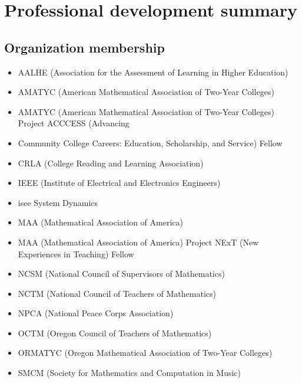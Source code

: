 \chapter{Professional development summary}\label{app:sec:memberships}

\begin{widepage}
\begin{multicols*}{2}
\section*{Organization membership}

\begin{itemize}[label={}]
\item AALHE (Association for the Assessment of Learning in Higher Education)
\item AMATYC (American Mathematical Association of Two-Year Colleges)
\item AMATYC (American Mathematical Association of Two-Year Colleges) Project ACCCESS  (Advancing \item Community College Careers:  Education, Scholarship, and Service) Fellow
\item CRLA (College Reading and Learning Association)
\item IEEE (Institute of Electrical and Electronics Engineers)
\item isee System Dynamics
\item MAA (Mathematical Association of America)
\item MAA (Mathematical Association of America) Project NExT (New Experiences in Teaching) Fellow
\item NCSM (National Council of Supervisors of Mathematics)
\item NCTM (National Council of Teachers of Mathematics)
\item NPCA (National Peace Corps Association)
\item OCTM (Oregon Council of Teachers of Mathematics)
\item ORMATYC (Oregon Mathematical Association of Two-Year Colleges)
\item SMCM (Society for Mathematics and Computation in Music)
\end{itemize}


\end{multicols*}
\end{widepage}
